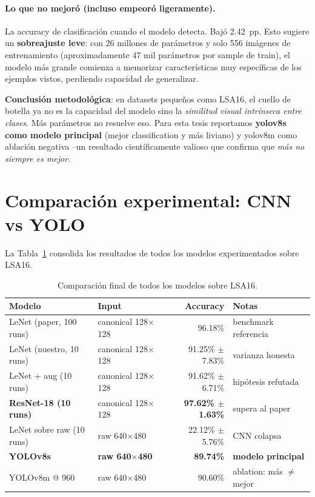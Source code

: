 \documentclass[a4paper,11pt]{article}
\begin{document}
\paragraph{Lo que no mejoró (incluso empeoró ligeramente).} La accuracy de clasificación cuando el modelo detecta. Bajó 2.42~pp. Esto sugiere un \textbf{sobreajuste leve}: con 26 millones de parámetros y solo 556 imágenes de entrenamiento (aproximadamente 47 mil parámetros por sample de train), el modelo más grande comienza a memorizar características muy específicas de los ejemplos vistos, perdiendo capacidad de generalizar.

\textbf{Conclusión metodológica}: en datasets pequeños como LSA16, el cuello de botella ya no es la capacidad del modelo sino la \emph{similitud visual intrínseca entre clases}. Más parámetros no resuelve eso. Para esta tesis reportamos \textbf{yolov8s como modelo principal} (mejor classification y más liviano) y yolov8m como ablación negativa --un resultado científicamente valioso que confirma que \emph{más no siempre es mejor}.

\section{Comparación experimental: CNN vs YOLO}
\label{sec:comparacion}

La Tabla~\ref{tab:final-comparison} consolida los resultados de todos los modelos experimentados sobre LSA16.

\begin{table}[h]
\centering
\caption{Comparación final de todos los modelos sobre LSA16.}
\label{tab:final-comparison}
\small
\begin{tabular}{p{4cm}p{3.8cm}rp{2.8cm}}
\toprule
\textbf{Modelo} & \textbf{Input} & \textbf{Accuracy} & \textbf{Notas} \\
\midrule
LeNet (paper, 100 runs) & canonical 128$\times$128 & 96.18\% & benchmark referencia \\
LeNet (nuestro, 10 runs) & canonical 128$\times$128 & 91.25\% $\pm$ 7.83\% & varianza honesta \\
LeNet + aug (10 runs) & canonical 128$\times$128 & 91.62\% $\pm$ 6.71\% & hipótesis refutada \\
\textbf{ResNet-18 (10 runs)} & canonical 128$\times$128 & \textbf{97.62\% $\pm$ 1.63\%} & supera al paper \\
\midrule
LeNet sobre raw (10 runs) & raw 640$\times$480 & 22.12\% $\pm$ 5.76\% & CNN colapsa \\
\textbf{YOLOv8s} & \textbf{raw 640$\times$480} & \textbf{89.74\%} & \textbf{modelo principal} \\
YOLOv8m @ 960 & raw 640$\times$480 & 90.60\% & ablation: más $\neq$ mejor \\
\bottomrule
\end{tabular}
\end{table}
\end{document}
